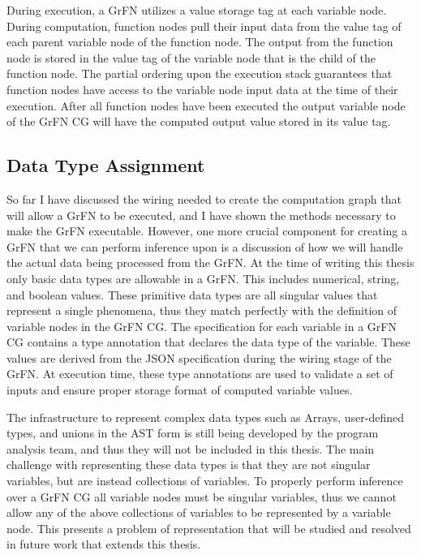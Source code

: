 During execution, a GrFN utilizes a value storage tag at each variable node.
During computation, function nodes pull their input data from the value tag of each parent variable node of the function node.
The output from the function node is stored in the value tag of the variable node that is the child of the function node.
The partial ordering upon the execution stack guarantees that function nodes have access to the variable node input data at the time of their execution.
After all function nodes have been executed the output variable node of the GrFN CG will have the computed output value stored in its value tag.


\subsection{Data Type Assignment\label{sec:data_type_assg}}
So far I have discussed the wiring needed to create the computation graph that will allow a GrFN to be executed, and I have shown the methods necessary to make the GrFN executable.
However, one more crucial component for creating a GrFN that we can perform inference upon is a discussion of how we will handle the actual data being processed from the GrFN.
At the time of writing this thesis only basic data types are allowable in a GrFN. This includes numerical, string, and boolean values.
These primitive data types are all singular values that represent a single phenomena, thus they match perfectly with the definition of variable nodes in the GrFN CG.
The specification for each variable in a GrFN CG contains a type annotation that declares the data type of the variable.
These values are derived from the JSON specification during the wiring stage of the GrFN.
At execution time, these type annotations are used to validate a set of inputs and ensure proper storage format of computed variable values.

The infrastructure to represent complex data types such as Arrays, user-defined types, and unions in the AST form is still being developed by the program analysis team, and thus they will not be included in this thesis.
The main challenge with representing these data types is that they are not singular variables, but are instead collections of variables.
To properly perform inference over a GrFN CG all variable nodes must be singular variables, thus we cannot allow any of the above collections of variables to be represented by a variable node.
This presents a problem of representation that will be studied  and resolved in future work that extends this thesis.




